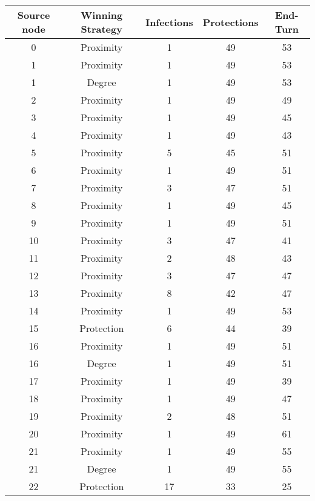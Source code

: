\documentclass[results.tex]{subfiles}
\begin{document}
\begin{center}
  \begin{tabular}{| c || c | c | c | c |}
    \hline
    {\bfseries Source node} & {\bfseries Winning Strategy} & {\bfseries Infections} & {\bfseries Protections} & {\bfseries End-Turn} \\  %
    \hline\hline
    0 & Proximity & 1 & 49 & 53 \\ 
    \hline
    1 & Proximity & 1 & 49 & 53 \\ 
    \hline
    1 & Degree & 1 & 49 & 53 \\ 
    \hline
    2 & Proximity & 1 & 49 & 49 \\ 
    \hline
    3 & Proximity & 1 & 49 & 45 \\ 
    \hline
    4 & Proximity & 1 & 49 & 43 \\ 
    \hline
    5 & Proximity & 5 & 45 & 51 \\ 
    \hline
    6 & Proximity & 1 & 49 & 51 \\ 
    \hline
    7 & Proximity & 3 & 47 & 51 \\ 
    \hline
    8 & Proximity & 1 & 49 & 45 \\ 
    \hline
    9 & Proximity & 1 & 49 & 51 \\ 
    \hline
    10 & Proximity & 3 & 47 & 41 \\ 
    \hline
    11 & Proximity & 2 & 48 & 43 \\ 
    \hline
    12 & Proximity & 3 & 47 & 47 \\ 
    \hline
    13 & Proximity & 8 & 42 & 47 \\ 
    \hline
    14 & Proximity & 1 & 49 & 53 \\ 
    \hline
    15 & Protection & 6 & 44 & 39 \\ 
    \hline
    16 & Proximity & 1 & 49 & 51 \\ 
    \hline
    16 & Degree & 1 & 49 & 51 \\ 
    \hline
    17 & Proximity & 1 & 49 & 39 \\ 
    \hline
    18 & Proximity & 1 & 49 & 47 \\ 
    \hline
    19 & Proximity & 2 & 48 & 51 \\ 
    \hline
    20 & Proximity & 1 & 49 & 61 \\ 
    \hline
    21 & Proximity & 1 & 49 & 55 \\ 
    \hline
    21 & Degree & 1 & 49 & 55 \\ 
    \hline
    22 & Protection & 17 & 33 & 25 \\ 

\end{tabular}
\end{center}
\end{document}
